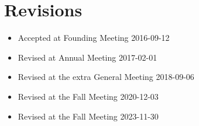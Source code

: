 \section*{Revisions}

\begin{itemize}
  \item Accepted at Founding Meeting 2016-09-12
  \item Revised at Annual Meeting 2017-02-01
  \item Revised at the extra General Meeting 2018-09-06  
  \item Revised at the Fall Meeting 2020-12-03
  \item Revised at the Fall Meeting 2023-11-30
\end{itemize}
